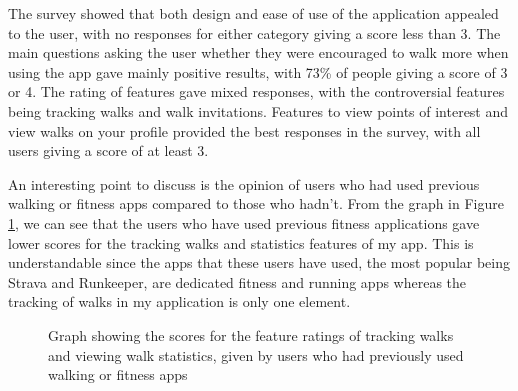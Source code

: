 The survey showed that both design and ease of use of the application appealed to the user, with no responses for either category giving a score less than 3. The main questions asking the user whether they were encouraged to walk more when using the app gave mainly positive results, with 73\% of people giving a score of 3 or 4. The rating of features gave mixed responses, with the controversial features being tracking walks and walk invitations. Features to view points of interest and view walks on your profile provided the best responses in the survey, with all users giving a score of at least 3.

An interesting point to discuss is the opinion of users who had used previous walking or fitness apps compared to those who hadn't. From the graph in Figure \ref{fig:survey-graph}, we can see that the users who have used previous fitness applications gave lower scores for the tracking walks and statistics features of my app. This is understandable since the apps that these users have used, the most popular being Strava and Runkeeper, are dedicated fitness and running apps whereas the tracking of walks in my application is only one element.

\begin{figure}[htb]
    \centering
    \caption{Graph showing the scores for the feature ratings of tracking walks and viewing walk statistics, given by users who had previously used walking or fitness apps}
    \label{fig:survey-graph}
\end{figure}

